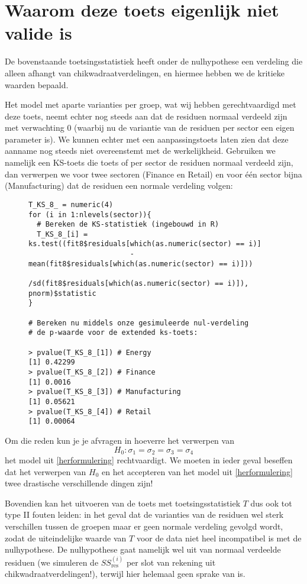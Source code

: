 \documentclass[a4paper]{report}
\begin{document}
\section{Waarom deze toets eigenlijk niet valide is}
  De bovenstaande toetsingsstatistiek heeft onder de nulhypothese een verdeling die alleen afhangt van chikwadraatverdelingen, en hiermee hebben we de kritieke waarden bepaald. 
  
  Het model met aparte varianties per groep, wat wij hebben gerechtvaardigd met deze toets, neemt echter nog steeds aan dat de residuen normaal verdeeld zijn met verwachting 0 (waarbij nu de variantie van de residuen per sector een eigen parameter is). We kunnen echter met een aanpassingstoets laten zien dat deze aanname nog steeds niet overeenstemt met de werkelijkheid. Gebruiken we namelijk een KS-toets die toets of per sector de residuen normaal verdeeld zijn, dan verwerpen we voor twee sectoren (Finance en Retail) en voor \' e\' en sector bijna (Manufacturing) dat de residuen een normale verdeling volgen:
  
  \begin{figure}[H]
  \begin{verbatim}
T_KS_8_ = numeric(4)
for (i in 1:nlevels(sector)){
  # Bereken de KS-statistiek (ingebouwd in R)
  T_KS_8_[i] = ks.test((fit8$residuals[which(as.numeric(sector) == i)] 
                        - mean(fit8$residuals[which(as.numeric(sector) == i)]))
                       /sd(fit8$residuals[which(as.numeric(sector) == i)]), pnorm)$statistic
} 

# Bereken nu middels onze gesimuleerde nul-verdeling
# de p-waarde voor de extended ks-toets:

> pvalue(T_KS_8_[1]) # Energy
[1] 0.42299
> pvalue(T_KS_8_[2]) # Finance
[1] 0.0016
> pvalue(T_KS_8_[3]) # Manufacturing
[1] 0.05621
> pvalue(T_KS_8_[4]) # Retail
[1] 0.00064
  \end{verbatim}
  \end{figure}
  
  Om die reden kun je je afvragen in hoeverre het verwerpen van $$H_0: \sigma_1 = \sigma_2 = \sigma_3 = \sigma_4$$ het model uit \ref{herformulering} rechtvaardigt. We moeten in ieder geval beseffen dat het verwerpen van $H_0$ en het accepteren van het model uit \ref{herformulering} twee drastische verschillende dingen zijn!
  
  Bovendien kan het uitvoeren van de toets met toetsingsstatistiek $T$ dus ook tot type II fouten leiden: in het geval dat de varianties van de residuen wel sterk verschillen tussen de groepen maar er geen normale verdeling gevolgd wordt, zodat de uiteindelijke waarde van $T$ voor de data niet heel incompatibel is met de nulhypothese. De nulhypothese gaat namelijk wel uit van normaal verdeelde residuen (we simuleren de $SS_{\text{res}}^{(i)}$ per slot van rekening uit chikwadraatverdelingen!), terwijl hier helemaal geen sprake van is.
  
\end{document}
